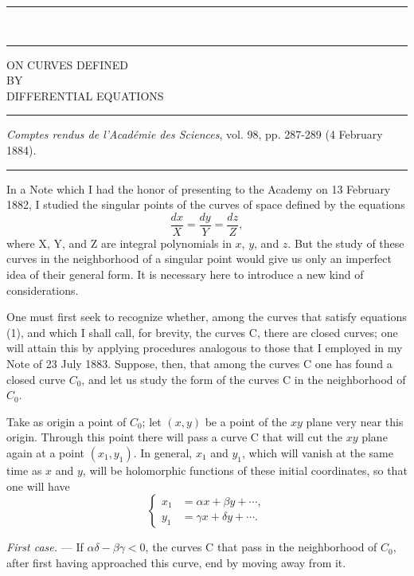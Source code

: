 \documentclass[11pt]{article}
\newcommand{\ornament}{\begin{center}\rule{2.5em}{0.4pt}\,\raisebox{0.1ex}{\tiny$\bullet\bullet\bullet$}\,\rule{2.5em}{0.4pt}\end{center}}
\newcommand{\shortline}{\begin{center}\rule{3.5em}{0.4pt}\end{center}}
\begin{document}
\ornament
\clearpage

\begin{center}
{\Large ON CURVES DEFINED}\\[0.8em]
{\small BY}\\[0.8em]
{\large DIFFERENTIAL EQUATIONS}
\end{center}
\shortline
\begin{center}
\emph{Comptes rendus de l’Académie des Sciences}, vol. 98, pp. 287-289 (4 February 1884).
\end{center}
\shortline

In a Note which I had the honor of presenting to the Academy on 13 February 1882, I studied the singular points of the curves of space defined by the equations
\begin{equation}\tag{1}
\frac{dx}{X}=\frac{dy}{Y}=\frac{dz}{Z},
\end{equation}
where X, Y, and Z are integral polynomials in $x$, $y$, and $z$. But the study of these curves in the neighborhood of a singular point would give us only an imperfect idea of their general form. It is necessary here to introduce a new kind of considerations.

One must first seek to recognize whether, among the curves that satisfy equations (1), and which I shall call, for brevity, the curves C, there are closed curves; one will attain this by applying procedures analogous to those that I employed in my Note of 23 July 1883. Suppose, then, that among the curves C one has found a closed curve $C_0$, and let us study the form of the curves C in the neighborhood of $C_0$.

Take as origin a point of $C_0$; let $(x,y)$ be a point of the $xy$ plane very near this origin. Through this point there will pass a curve C that will cut the $xy$ plane again at a point $(x_1,y_1)$. In general, $x_1$ and $y_1$, which will vanish at the same time as $x$ and $y$, will be holomorphic functions of these initial coordinates, so that one will have
\begin{equation}\tag{2}
\left\{
\begin{aligned}
x_1&=\alpha x+\beta y+\cdots,\\
y_1&=\gamma x+\delta y+\cdots.
\end{aligned}
\right.
\end{equation}

\emph{First case.} --- If $\alpha\delta-\beta\gamma<0$, the curves C that pass in the neighborhood of $C_0$, after first having approached this curve, end by moving away from it.
\end{document}
